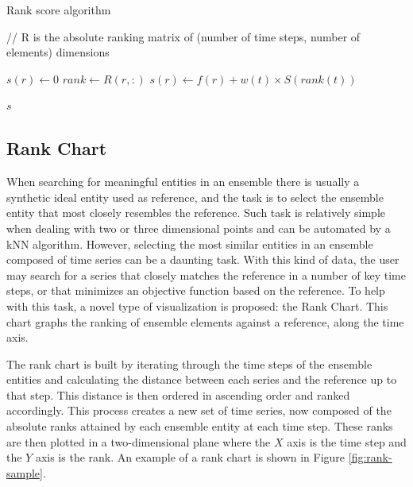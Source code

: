 \documentclass[final,5p,times,twocolumn]{elsarticle}
\begin{document}
\begin{algorithm}
  \caption{Rank score algorithm}
  \begin{algorithmic}[1]
    \State // R is the absolute ranking matrix of (number of time steps, number of elements) dimensions
    
    	\State $s(r) \gets 0$
	    \State $rank \gets R(r, :)$
	    	\State $s(r) \gets f(r) + w(t) \times S(rank(t))$
	    \EndFor          
    	\EndFor
	
        \State \Return $s$
    \EndProcedure
  \end{algorithmic}
  \label{alg:rank-score}
\end{algorithm}

\subsection{Rank Chart}
\label{sec:rank}
When searching for meaningful entities in an ensemble there is usually a synthetic ideal entity used as reference, and the task is to select the ensemble entity that most closely resembles the reference. Such task is relatively simple when dealing with two or three dimensional points and can be automated by a kNN algorithm. However, selecting the most similar entities in an ensemble composed of time series can be a daunting task. With this kind of data, the user may search for a series that closely matches the reference in a number of key time steps, or that minimizes an objective function based on the reference. To help with this task, a novel type of visualization is proposed: the Rank Chart. This chart graphs the ranking of ensemble elements against a reference, along the time axis.

The rank chart is built by iterating through the time steps of the ensemble entities and calculating the distance between each series and the reference up to that step. This distance is then ordered in ascending order and ranked accordingly. This process creates a new set of time series, now composed of the absolute ranks attained by each ensemble entity at each time step. These ranks are then plotted in a two-dimensional plane where the $X$ axis is the time step and the $Y$ axis is the rank. An example of a rank chart is shown in Figure \ref{fig:rank-sample}.
\end{document}
